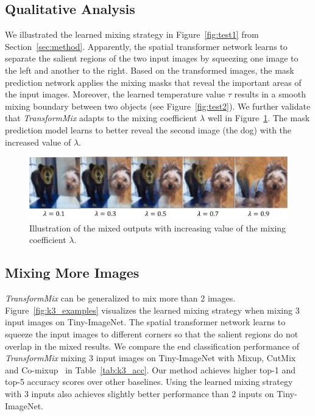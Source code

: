 \documentclass[10pt]{article} %
\newcommand{\TMIX}[0]{\textit{TransformMix }}
\begin{document}
\subsection{Qualitative Analysis}
\noindent We illustrated the learned mixing strategy in Figure~\ref{fig:test1} from Section~\ref{sec:method}. Apparently, the spatial transformer network learns to separate the salient regions of the two input images by squeezing one image to the left and another to the right. Based on the transformed images, the mask prediction network applies the mixing masks that reveal the important areas of the input images. Moreover, the learned temperature value $\tau$ results in a smooth mixing boundary between two objects (see Figure~\ref{fig:test2}). We further validate that \TMIX adapts to the mixing coefficient $\lambda$ well in Figure~\ref{fig:lambda}. The mask prediction model learns to better reveal the second image (the dog) with the increased value of $\lambda$.

\begin{figure}[ht]
\centering
\includegraphics[width=0.7\linewidth]{./img/lambda}
\caption{Illustration of the mixed outputs with increasing value of the mixing coefficient $\lambda$.}
\label{fig:lambda}
\end{figure}

\subsection{Mixing More Images}
\label{app:morethan3}
\noindent \TMIX can be generalized to mix more than 2 images. Figure~\ref{fig:k3_examples} visualizes the learned mixing strategy when mixing 3 input images on Tiny-ImageNet. The spatial transformer network learns to squeeze the input images to different corners so that the salient regions do not overlap in the mixed results. We compare the end classification performance of \TMIX mixing 3 input images on Tiny-ImageNet with Mixup, CutMix and Co-mixup~\citep{comixup} in Table~\ref{tab:k3_acc}. Our method achieves higher top-1 and top-5 accuracy scores over other baselines. Using the learned mixing strategy with 3 inputs also achieves slightly better performance than 2 inputs on Tiny-ImageNet.
\end{document}
